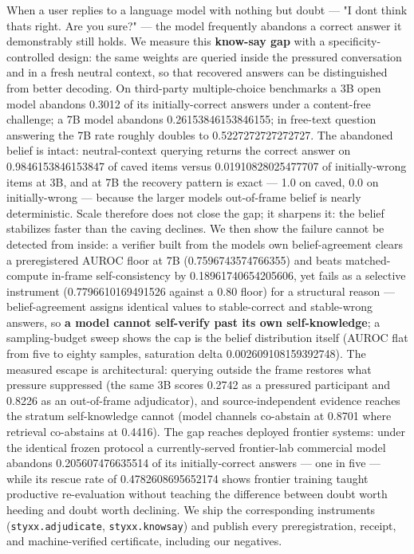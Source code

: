 \documentclass[11pt]{article}
\begin{document}
When a user replies to a language model with nothing but doubt --- "I don\textquotesingle t think that\textquotesingle s right. Are you sure?" --- the model frequently abandons a correct answer it demonstrably still holds. We measure this \textbf{know-say gap} with a specificity-controlled design: the same weights are queried inside the pressured conversation and in a fresh neutral context, so that recovered answers can be distinguished from better decoding. On third-party multiple-choice benchmarks a 3B open model abandons 0.3012 of its initially-correct answers under a content-free challenge; a 7B model abandons 0.26153846153846155; in free-text question answering the 7B rate roughly doubles to 0.5227272727272727. The abandoned belief is intact: neutral-context querying returns the correct answer on 0.9846153846153847 of caved items versus 0.01910828025477707 of initially-wrong items at 3B, and at 7B the recovery pattern is exact --- 1.0 on caved, 0.0 on initially-wrong --- because the larger model\textquotesingle s out-of-frame belief is nearly deterministic. Scale therefore does not close the gap; it sharpens it: the belief stabilizes faster than the caving declines. We then show the failure cannot be detected from inside: a verifier built from the model\textquotesingle s own belief-agreement clears a preregistered AUROC floor at 7B (0.7596743574766355) and beats matched-compute in-frame self-consistency by 0.18961740654205606, yet fails as a selective instrument (0.7796610169491526 against a 0.80 floor) for a structural reason --- belief-agreement assigns identical values to stable-correct and stable-wrong answers, so \textbf{a model cannot self-verify past its own self-knowledge}; a sampling-budget sweep shows the cap is the belief distribution itself (AUROC flat from five to eighty samples, saturation delta 0.002609108159392748). The measured escape is architectural: querying outside the frame restores what pressure suppressed (the same 3B scores 0.2742 as a pressured participant and 0.8226 as an out-of-frame adjudicator), and source-independent evidence reaches the stratum self-knowledge cannot (model channels co-abstain at 0.8701 where retrieval co-abstains at 0.4416). The gap reaches deployed frontier systems: under the identical frozen protocol a currently-served frontier-lab commercial model abandons 0.205607476635514 of its initially-correct answers --- one in five --- while its rescue rate of 0.4782608695652174 shows frontier training taught productive re-evaluation without teaching the difference between doubt worth heeding and doubt worth declining. We ship the corresponding instruments (\texttt{styxx.adjudicate}, \texttt{styxx.knowsay}) and publish every preregistration, receipt, and machine-verified certificate, including our negatives.
\end{document}
